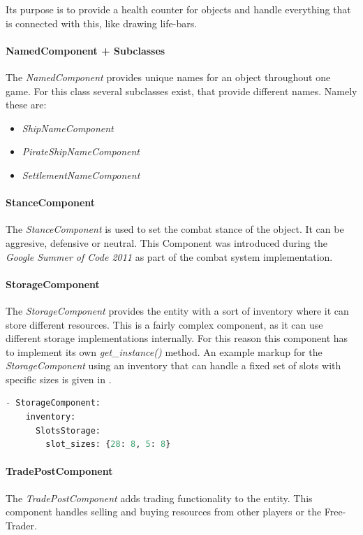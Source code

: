 Its purpose is to provide a health counter for objects and handle everything that is connected with this, like drawing
life-bars.

\paragraph{NamedComponent + Subclasses}
The \textit{NamedComponent} provides unique names for an object throughout one game. For this class several subclasses
exist, that provide different names. Namely these are:
\begin{itemize}
    \item \textit{ShipNameComponent}
    \item \textit{PirateShipNameComponent}
    \item \textit{SettlementNameComponent}
\end{itemize}

\paragraph{StanceComponent}
The \textit{StanceComponent} is used to set the combat stance of the object. It can be aggresive, defensive or neutral.
This Component was introduced during the \textit{Google Summer of Code 2011} as part of the combat system
implementation.

\paragraph{StorageComponent}
The \textit{StorageComponent} provides the entity with a sort of inventory where it can store different resources. This
is a fairly complex component, as it can use different storage implementations internally. For this reason this
component has to implement its own \textit{get\_instance()} method. An example markup for the \textit{StorageComponent}
using an inventory that can handle a fixed set of slots with specific sizes is given in .

\begin{lstlisting}[language=python,caption=YAML representation of the StorageComponent using a SlotStorage,
label=storagyaml]
- StorageComponent:
    inventory:
      SlotsStorage:
        slot_sizes: {28: 8, 5: 8}
\end{lstlisting}

\paragraph{TradePostComponent}
The \textit{TradePostComponent} adds trading functionality to the entity. This component handles selling and buying
resources from other players or the Free-Trader.

